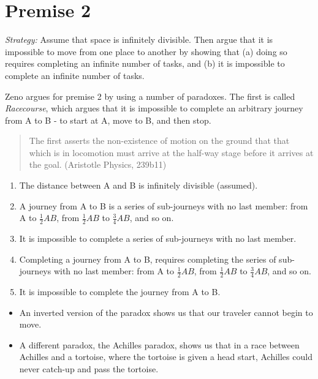 \documentclass[]{article}
\begin{document}
\section{Premise 2}\label{premise-2}


\emph{Strategy:} Assume that space is infinitely divisible. Then argue
that it is impossible to move from one place to another by showing that
(a) doing so requires completing an infinite number of tasks, and (b) it
is impossible to complete an infinite number of tasks.

Zeno argues for premise 2 by using a number of paradoxes. The first is
called \emph{Racecourse}, which argues that it is impossible to complete
an arbitrary journey from A to B - to start at A, move to B, and then
stop.

\begin{quote}
The first asserts the non-existence of motion on the ground that that
which is in locomotion must arrive at the half-way stage before it
arrives at the goal. (Aristotle Physics, 239b11)
\end{quote}

\begin{enumerate}
\def\labelenumi{\Alph{enumi}.}
\item
  The distance between A and B is infinitely divisible (assumed).
\item
  A journey from A to B is a series of sub-journeys with no last member:
  from A to \(\frac{1}{2}AB\), from \(\frac{1}{2}AB\) to
  \(\frac{3}{4}AB\), and so on.
\item
  It is impossible to complete a series of sub-journeys with no last
  member.
\item
  Completing a journey from A to B, requires completing the series of
  sub-journeys with no last member: from A to \(\frac{1}{2}AB\), from
  \(\frac{1}{2}AB\) to \(\frac{3}{4}AB\), and so on.
\item
  It is impossible to complete the journey from A to B.
\end{enumerate}

\begin{itemize}
\itemsep1pt\parskip0pt
\item
  An inverted version of the paradox shows us that our traveler cannot
  begin to move.
\item
  A different paradox, the Achilles paradox, shows us that in a race
  between Achilles and a tortoise, where the tortoise is given a head
  start, Achilles could never catch-up and pass the tortoise.
\end{itemize}
\end{document}
